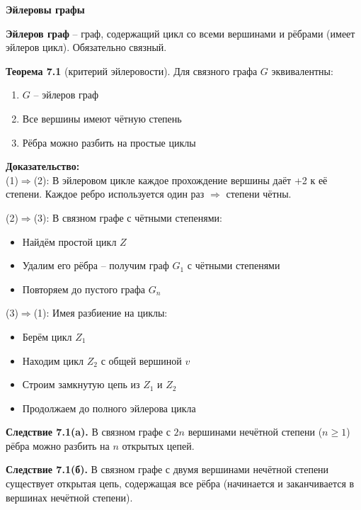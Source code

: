 \textbf{Эйлеровы графы}

\noindent\textbf{Эйлеров граф} -- граф, содержащий цикл со всеми вершинами и рёбрами (имеет эйлеров цикл). Обязательно связный.

\noindent\textbf{Теорема 7.1} (критерий эйлеровости). Для связного графа $G$ эквивалентны:
\begin{enumerate}
\item $G$ -- эйлеров граф
\item Все вершины имеют чётную степень
\item Рёбра можно разбить на простые циклы
\end{enumerate}

\noindent\textbf{Доказательство:}\\
(1)$\Rightarrow$(2): В эйлеровом цикле каждое прохождение вершины даёт +2 к её степени. Каждое ребро используется один раз $\Rightarrow$ степени чётны.

\noindent(2)$\Rightarrow$(3): В связном графе с чётными степенями:
\begin{itemize}[noitemsep]
\item Найдём простой цикл $Z$
\item Удалим его рёбра -- получим граф $G_1$ с чётными степенями
\item Повторяем до пустого графа $G_n$
\end{itemize}

\noindent(3)$\Rightarrow$(1): Имея разбиение на циклы:
\begin{itemize}[noitemsep]
\item Берём цикл $Z_1$
\item Находим цикл $Z_2$ с общей вершиной $v$
\item Строим замкнутую цепь из $Z_1$ и $Z_2$
\item Продолжаем до полного эйлерова цикла
\end{itemize}

\noindent\textbf{Следствие 7.1(a).} В связном графе с $2n$ вершинами нечётной степени ($n \geq 1$) рёбра можно разбить на $n$ открытых цепей.

\noindent\textbf{Следствие 7.1(б).} В связном графе с двумя вершинами нечётной степени существует открытая цепь, содержащая все рёбра (начинается и заканчивается в вершинах нечётной степени).